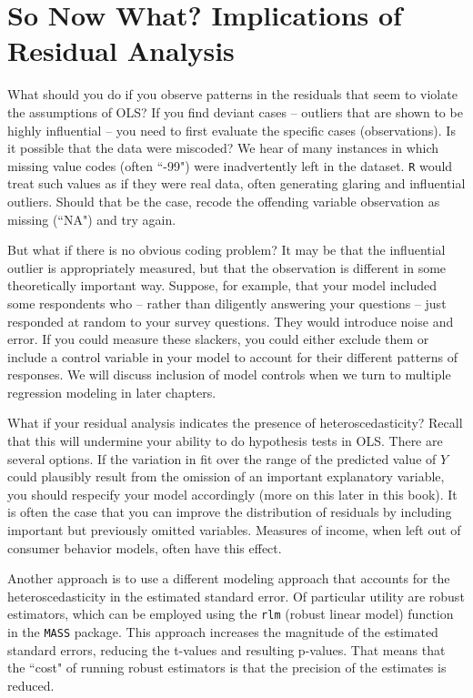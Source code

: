 \documentclass[11pt,openany]{book}\usepackage[]{graphicx}\usepackage[]{color}
\begin{document}
{\section{So Now What? Implications of Residual Analysis}

What should you do if you observe patterns in the residuals that seem to violate the assumptions of OLS? If you find deviant cases -- outliers that are shown to be highly influential -- you need to first evaluate the specific cases (observations). Is it possible that the data were miscoded? We hear of many instances in which missing value codes (often ``-99") were inadvertently left in the dataset. \texttt{R} would treat such values as if they were real data, often generating glaring and influential outliers. Should that be the case, recode the offending variable observation as missing (``NA") and try again.  


But what if there is no obvious coding problem? It may be that the influential outlier is appropriately measured, but that the observation is different in some theoretically important way. Suppose, for example, that your model included some respondents who -- rather than diligently answering your questions -- just responded at random to your survey questions. They would introduce noise and error. If you could measure these slackers, you could either exclude them or include a control variable in your model to account for their different patterns of responses. We will discuss inclusion of model controls when we turn to multiple regression modeling in later chapters.

What if your residual analysis indicates the presence of heteroscedasticity? Recall that this will undermine your ability to do hypothesis tests in OLS. There are several options. If the variation in fit over the range of the predicted value of $Y$ could plausibly result from the omission of an important explanatory variable, you should respecify your model accordingly (more on this later in this book). It is often the case that you can improve the distribution of residuals by including important but previously omitted variables. Measures of income, when left out of consumer behavior models, often have this effect.

Another approach is to use a different modeling approach that accounts for the heteroscedasticity in the estimated standard error. Of particular utility are robust estimators, which can be employed using the \texttt{rlm} (robust linear model) function in the \texttt{MASS} package. This approach increases the magnitude of the estimated standard errors, reducing the t-values and resulting p-values. That means that the ``cost" of running robust estimators is that the precision of the estimates is reduced.

}
\end{document}
